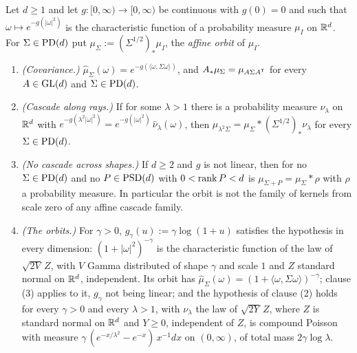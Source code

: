 \begin{proposition}\label{prop:affine-orbits}
Let $d \ge 1$ and let $g : [0,\infty) \to [0,\infty)$ be continuous with $g(0) = 0$ and such that
$\omega \mapsto e^{-g(|\omega|^2)}$ is the characteristic function of a probability measure
$\mu_I$ on $\mathbb{R}^d$. For $\Sigma \in \mathrm{PD}(d)$ put $\mu_\Sigma := (\Sigma^{1/2})_*\mu_I$, the
\emph{affine orbit} of $\mu_I$.
\begin{enumerate}
\item \emph{(Covariance.)} $\widehat\mu_\Sigma(\omega) = e^{-g(\langle\omega,\Sigma\omega\rangle)}$,
and $A_*\mu_\Sigma = \mu_{A\Sigma A^{\mathsf{T}}}$ for every $A \in \mathrm{GL}(d)$ and $\Sigma \in \mathrm{PD}(d)$.
\item \emph{(Cascade along rays.)} If for some $\lambda > 1$ there is a probability measure
$\nu_\lambda$ on $\mathbb{R}^d$ with $e^{-g(\lambda^2|\omega|^2)} = e^{-g(|\omega|^2)}\,\widehat\nu_\lambda(\omega)$,
then $\mu_{\lambda^2\Sigma} = \mu_\Sigma * (\Sigma^{1/2})_*\nu_\lambda$ for every
$\Sigma \in \mathrm{PD}(d)$.
\item \emph{(No cascade across shapes.)} If $d \ge 2$ and $g$ is not linear, then for no
$\Sigma \in \mathrm{PD}(d)$ and no $P \in \mathrm{PSD}(d)$ with $0 < \operatorname{rank} P < d$ is
$\mu_{\Sigma+P} = \mu_\Sigma * \rho$ with $\rho$ a probability measure. In particular the orbit is
not the family of kernels from scale zero of any affine cascade family.
\item \emph{(The \Matern{} orbits.)} For $\gamma > 0$, $g_\gamma(u) := \gamma\log(1+u)$ satisfies
the hypothesis in every dimension: $(1+|\omega|^2)^{-\gamma}$ is the characteristic function of
the law of $\sqrt{2V}\,Z$, with $V$ Gamma distributed of shape $\gamma$ and scale $1$ and $Z$
standard normal on $\mathbb{R}^d$, independent. Its orbit has
$\widehat\mu_\Sigma(\omega) = (1 + \langle\omega,\Sigma\omega\rangle)^{-\gamma}$; clause (3)
applies to it, $g_\gamma$ not being linear; and the hypothesis of clause (2) holds for every
$\gamma > 0$ and every $\lambda > 1$, with $\nu_\lambda$ the law of $\sqrt{2Y}\,Z$, where $Z$ is
standard normal on $\mathbb{R}^d$ and $Y \ge 0$, independent of $Z$, is compound Poisson with \Levy{}
measure $\gamma\,(e^{-x/\lambda^2} - e^{-x})\,x^{-1}dx$ on $(0,\infty)$, of total mass
$2\gamma\log\lambda$.
\end{enumerate}
\end{proposition}

